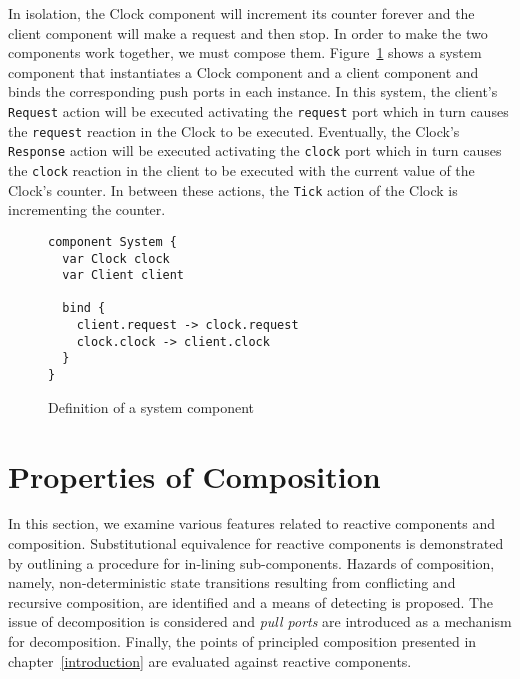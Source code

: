In isolation, the Clock component will increment its counter forever and the client component will make a request and then stop.
In order to make the two components work together, we must compose them.
Figure~\ref{system_component} shows a system component that instantiates a Clock component and a client component and binds the corresponding push ports in each instance.
In this system, the client's \verb+Request+ action will be executed activating the \verb+request+ port which in turn causes the \verb+request+ reaction in the Clock to be executed.
Eventually, the Clock's \verb+Response+ action will be executed activating the \verb+clock+ port which in turn causes the \verb+clock+ reaction in the client to be executed with the current value of the Clock's counter.
In between these actions, the \verb+Tick+ action of the Clock is incrementing the counter.

\begin{figure}
\begin{verbatim}
component System {
  var Clock clock
  var Client client

  bind {
    client.request -> clock.request
    clock.clock -> client.clock
  }
}
\end{verbatim}
\caption{Definition of a system component\label{system_component}}
\end{figure}

\section{Properties of Composition}
In this section, we examine various features related to reactive components and composition.
Substitutional equivalence for reactive components is demonstrated by outlining a procedure for in-lining sub-components.
Hazards of composition, namely, non-deterministic state transitions resulting from conflicting and recursive composition, are identified and a means of detecting is proposed.
The issue of decomposition is considered and \emph{pull ports} are introduced as a mechanism for decomposition.
Finally, the points of principled composition presented in chapter~\ref{introduction} are evaluated against reactive components.

